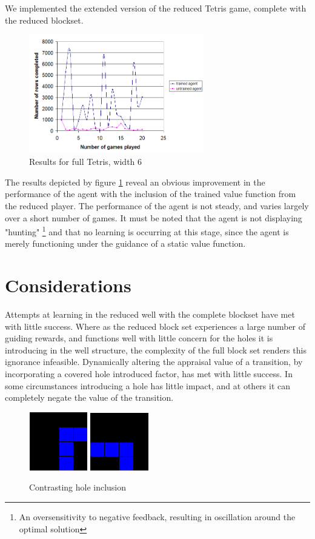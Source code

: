 \documentclass[a4paper,twocolumn]{article}
\begin{document}
We implemented the extended version of the reduced Tetris game, complete with the reduced blockset.  

\begin{figure}[h]
\centering
\includegraphics[width=3in]{fullreducedgame.png}
\caption{Results for full Tetris, width 6}
\label{fig:fullgame}
\end{figure}

The results depicted by figure \ref{fig:fullgame} reveal an obvious improvement in the performance of the agent with the inclusion of the trained value function from the reduced player. The performance of the agent is not steady, and varies largely over a short number of games. It must be noted that the agent is not displaying "hunting" \footnote{An oversensitivity to negative feedback, resulting in oscillation around the optimal solution} and that no learning is occurring at this stage, since the agent is merely functioning under the guidance of a static value function.

\section{Considerations}

Attempts at learning in the reduced well with the complete blockset have met with little success. Where as the reduced block set experiences a large number of guiding rewards, and functions well with little concern for the holes it is introducing in the well structure, the complexity of the full block set renders this ignorance infeasible. Dynamically altering the appraisal value of a transition, by incorporating a covered hole introduced factor, has met with little success. In some circumstances introducing a hole has little impact, and at others it can completely negate the value of the transition. 

\begin{figure}[h]
\centering
\includegraphics[width=1in]{worthless.png}
\includegraphics[width=1in]{notworthless.png}
\caption{Contrasting hole inclusion}
\label{fig:diffholes}
\end{figure}
\end{document}
